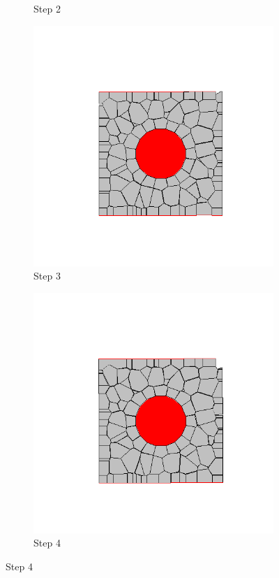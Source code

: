 \begin{figure}[ht!]
\begin{subfigure}{.25\textwidth}
      \caption{Step 2}
      \end{subfigure}%
      \begin{subfigure}{.25\textwidth}
        \centering
        \includegraphics[width=1.0\linewidth]{Files/Small_DEF/CR/DEP5-STEP(003).png}
      \caption{Step 3}
      \end{subfigure}%
      \begin{subfigure}{.25\textwidth}
        \centering
        \includegraphics[width=1.0\linewidth]{Files/Small_DEF/CR/DEP5-STEP(004).png}
      \caption{Step 4}
      \end{subfigure}


\end{figure}
